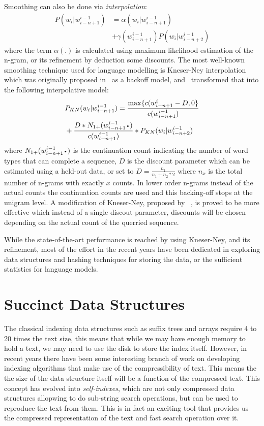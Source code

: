 \documentclass[11pt]{article}
\newcommand*{\LargerCdot}{\raisebox{-0.75ex}{\scalebox{2}{$\cdot$}}}
\begin{document}
Smoothing can also be done via \emph{interpolation}:
\begin{align}
P(w_{i}|w_{i-n+1}^{i-1}) &= \alpha(w_{i}|w_{i-n+1}^{i-1})\\\nonumber
&+\gamma(w_{i-n+1}^{i-1})P(w_{i}|w_{i-n+2}^{i-1})
\end{align}
where the term $\alpha(.)$ is calculated using maximum likelihood estimation of the n-gram, or its refinement by deduction some discounts. The most well-known smoothing technique used for language modelling is Kneser-Ney interpolation which was originally proposed in~\citep{kneser1995improved} as a backoff model, and~ transformed that into the following interpolative model:
\begin{align}
&P_{KN}(w_{i}|w_{i-n+1}^{i-1}) = \frac{\max\{c(w_{i-n+1}^{i} - D,0\}}{c(w_{i-n+1}^{i-1})}\\\nonumber
&+ \frac{D*N_{1+}(w_{i-n+1}^{i-1}\LargerCdot)}{c(w_{i-n+1}^{i-1})}*P_{KN}(w_{i}|w_{i-n+2}^{i-1})
\end{align}
where $N_{1+}(w_{i-n+1}^{i-1}\LargerCdot)$ is the continuation count indicating the number of word types that can complete a sequence, $D$ is the discount parameter which can be estimated using a held-out data, or set to $D=\frac{n_1}{n_{1}+n_{2}*2}$ where $n_x$ is the total number of n-grams with exactly $x$ counts. In lower order n-grams instead of the actual counts the continuation counts are used and this backing-off stops at the unigram level. A modification of Kneser-Ney, proposed by ~\citep{chen1996empirical}, is proved to be more effective which instead of a single discout parameter, discounts will be chosen depending on the actual count of the querried sequence.

While the state-of-the-art performance is reached by using Kneser-Ney, and its refinement, most of the effort in the recent years have been dedicated in exploring data structures and hashing techniques for storing the data, or the sufficient statistics for language models. 
 
\section{Succinct Data Structures}
The classical indexing data structures such as suffix trees and arrays require 4 to 20 times the text size, this means that while we may have enough memory to hold a text, we may need to use the disk to store the index itself. However, in recent years there have been some interesting branch of work on developing indexing algorithms that make use of the compressibility of text. This means the the size of the data structure itself will be a function of the compressed text. This concept has evolved into \emph{self-indexes}, which are not only compressed data structures allopwing to do sub-string search operations, but can be used to reproduce the text from them. This is in fact an exciting tool that provides us the compressed representation of the text and fast search operation over it.
\end{document}

